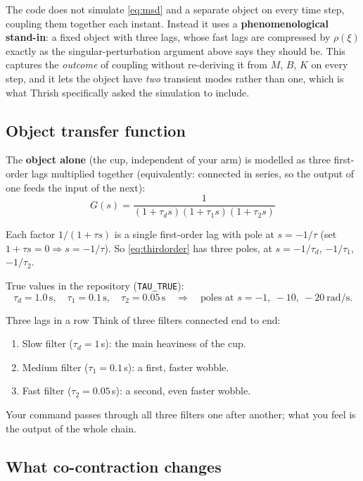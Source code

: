 \documentclass[11pt,a4paper]{article}
\begin{document}
The code does not simulate \eqref{eq:msd} and a separate object on every time
step, coupling them together each instant. Instead it uses a
\textbf{phenomenological stand-in}: a fixed object with three lags, whose fast
lags are compressed by $\rho(\xi)$ exactly as the singular-perturbation
argument above says they should be. This captures the \emph{outcome} of
coupling without re-deriving it from $M$, $B$, $K$ on every step, and it lets
the object have \emph{two} transient modes rather than one, which is what
Thrish specifically asked the simulation to include.

\subsection{Object transfer function}

The \textbf{object alone} (the cup, independent of your arm) is modelled as
three first-order lags multiplied together (equivalently: connected in
series, so the output of one feeds the input of the next):
\begin{equation}
\boxed{\; G(s) = \frac{1}{(1+\tau_d s)(1+\tau_1 s)(1+\tau_2 s)}\;}
\label{eq:thirdorder}
\end{equation}

Each factor $1/(1+\tau s)$ is a single first-order lag with pole at
$s=-1/\tau$ (set $1+\tau s=0\Rightarrow s=-1/\tau$). So \eqref{eq:thirdorder}
has three poles, at $s=-1/\tau_d$, $-1/\tau_1$, $-1/\tau_2$.

True values in the repository (\texttt{TAU\_TRUE}):
\[
\tau_d = 1.0\,\text{s},\quad \tau_1 = 0.1\,\text{s},\quad \tau_2 = 0.05\,\text{s}
\quad\Longrightarrow\quad
\text{poles at } s=-1,\ -10,\ -20\ \text{rad/s.}
\]

\begin{examplebox}{Three lags in a row}
Think of three filters connected end to end:
\begin{enumerate}[nosep]
\item Slow filter ($\tau_d=1$\,s): the main heaviness of the cup.
\item Medium filter ($\tau_1=0.1$\,s): a first, faster wobble.
\item Fast filter ($\tau_2=0.05$\,s): a second, even faster wobble.
\end{enumerate}
Your command passes through all three filters one after another; what you
feel is the output of the whole chain.
\end{examplebox}

\subsection{What co-contraction changes}
\end{document}
